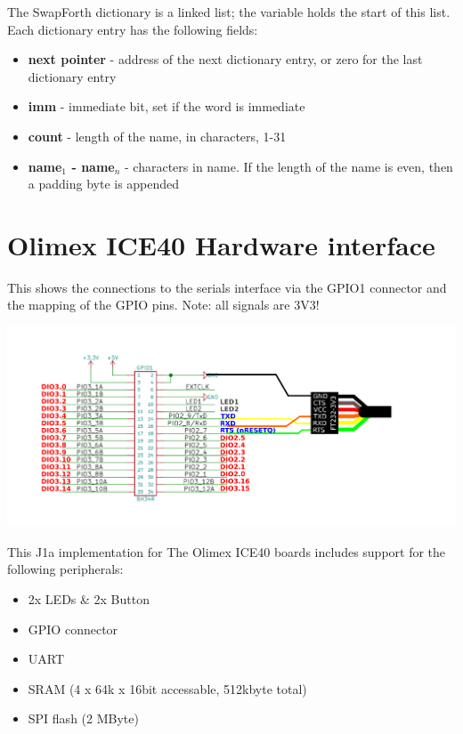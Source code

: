 The SwapForth dictionary is a linked list;
the variable  holds the start of this list.
Each dictionary entry has the following fields:

\begin{itemize}
\item \textbf{next pointer} - address of the next dictionary entry, or zero for the last dictionary entry
\item \textbf{imm} - immediate bit, set if the word is immediate
\item \textbf{count} - length of the name, in characters, 1-31
\item \textbf{name$_1$ - name$_n$} - characters in name. If the length of the name is even, then a padding byte is appended
\end{itemize}

\chapter{Olimex ICE40 Hardware interface}
This shows the connections to the serials interface via the GPIO1 connector and the mapping of the GPIO pins. Note: all signals are 3V3!
\begin{center}
\includegraphics[width=1.4\textwidth]{olimex_io.png}
\end{center}

\newpage 

This J1a implementation for The Olimex ICE40 boards includes support for the following peripherals:
\begin{itemize}

\item 2x LEDs & 2x Button 
\item GPIO connector 
\item UART 
\item SRAM (4 x 64k x 16bit accessable, 512kbyte total)
\item SPI flash (2 MByte) 

\end{itemize}


